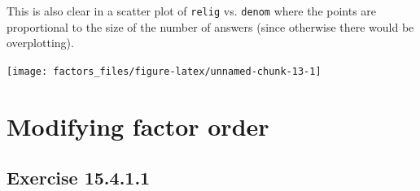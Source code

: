 \documentclass[]{book}
\newenvironment{Shaded}{\begin{snugshade}}{\end{snugshade}}
\newcommand{\CommentTok}[1]{\textcolor[rgb]{0.56,0.35,0.01}{\textit{#1}}}
\newcommand{\DataTypeTok}[1]{\textcolor[rgb]{0.13,0.29,0.53}{#1}}
\newcommand{\DecValTok}[1]{\textcolor[rgb]{0.00,0.00,0.81}{#1}}
\newcommand{\KeywordTok}[1]{\textcolor[rgb]{0.13,0.29,0.53}{\textbf{#1}}}
\newcommand{\NormalTok}[1]{#1}
\newcommand{\OperatorTok}[1]{\textcolor[rgb]{0.81,0.36,0.00}{\textbf{#1}}}
\newcommand{\StringTok}[1]{\textcolor[rgb]{0.31,0.60,0.02}{#1}}
\theoremstyle{plain}
\theoremstyle{remark}
\begin{document}
\begin{Shaded}
\end{Shaded}

This is also clear in a scatter plot of \texttt{relig} vs. \texttt{denom} where the points are
proportional to the size of the number of answers (since otherwise there would be overplotting).

\begin{Shaded}
\end{Shaded}

\begin{center}\texttt{[image: factors\_files/figure-latex/unnamed-chunk-13-1]} \end{center}

\hypertarget{modifying-factor-order}{%
\section{Modifying factor order}\label{modifying-factor-order}}

\hypertarget{exercise-15.4.1.1}{%
\subsection*{\texorpdfstring{Exercise {15.4.1.1}}{Exercise 15.4.1.1}}\label{exercise-15.4.1.1}}
\end{document}
